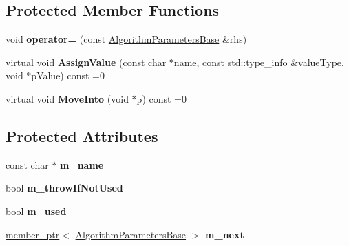 \subsection*{Protected Member Functions}
\begin{DoxyCompactItemize}
\item 
\hypertarget{class_algorithm_parameters_base_a657ff96be07a67ec24be7102ef1a0466}{
void {\bfseries operator=} (const \hyperlink{class_algorithm_parameters_base}{AlgorithmParametersBase} \&rhs)}
\label{class_algorithm_parameters_base_a657ff96be07a67ec24be7102ef1a0466}

\item 
\hypertarget{class_algorithm_parameters_base_a47951eae19024ac7244d5ca95baba46a}{
virtual void {\bfseries AssignValue} (const char $\ast$name, const std::type\_\-info \&valueType, void $\ast$pValue) const =0}
\label{class_algorithm_parameters_base_a47951eae19024ac7244d5ca95baba46a}

\item 
\hypertarget{class_algorithm_parameters_base_af83c89470f1808dbe0d7ac49578b4ef6}{
virtual void {\bfseries MoveInto} (void $\ast$p) const =0}
\label{class_algorithm_parameters_base_af83c89470f1808dbe0d7ac49578b4ef6}

\end{DoxyCompactItemize}
\subsection*{Protected Attributes}
\begin{DoxyCompactItemize}
\item 
\hypertarget{class_algorithm_parameters_base_a35cb481a90a884f7eb61de6fabfb83a6}{
const char $\ast$ {\bfseries m\_\-name}}
\label{class_algorithm_parameters_base_a35cb481a90a884f7eb61de6fabfb83a6}

\item 
\hypertarget{class_algorithm_parameters_base_a2874ec341abb4c70e4f1b5ca05859035}{
bool {\bfseries m\_\-throwIfNotUsed}}
\label{class_algorithm_parameters_base_a2874ec341abb4c70e4f1b5ca05859035}

\item 
\hypertarget{class_algorithm_parameters_base_a3642eca6b27ce691a8289a6b99a8769d}{
bool {\bfseries m\_\-used}}
\label{class_algorithm_parameters_base_a3642eca6b27ce691a8289a6b99a8769d}

\item 
\hypertarget{class_algorithm_parameters_base_aabb65fa0f5cc0832824f777a8f5d64cc}{
\hyperlink{classmember__ptr}{member\_\-ptr}$<$ \hyperlink{class_algorithm_parameters_base}{AlgorithmParametersBase} $>$ {\bfseries m\_\-next}}
\label{class_algorithm_parameters_base_aabb65fa0f5cc0832824f777a8f5d64cc}

\end{DoxyCompactItemize}

